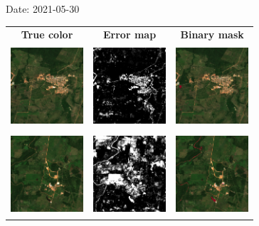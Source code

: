 \documentclass{beamer}
\begin{document}
\begin{frame}{Date: 2021-05-30}
    \begin{tabular}{ccc}
        \textbf{True color} & \textbf{Error map} & \textbf{Binary mask}\\
        \includegraphics[width=2.7cm,height=3cm]{Figures/v6/20210530/TCI_zoom1.png}& \includegraphics[width=2.7cm,height=3cm]{Figures/v6/20210530/error_map_zoom1.png} &\includegraphics[width=2.7cm,height=3cm]{Figures/v6/20210530/zoom1_BI.png}\\
        \includegraphics[width=2.7cm,height=3cm]{Figures/v6/20210530/TCI_zoom2.png}& \includegraphics[width=2.7cm,height=3cm]{Figures/v6/20210530/error_map_zoom2.png} &\includegraphics[width=2.7cm,height=3cm]{Figures/v6/20210530/zoom2_BI.png}\\
        \end{tabular}
\end{frame}
\end{document}
